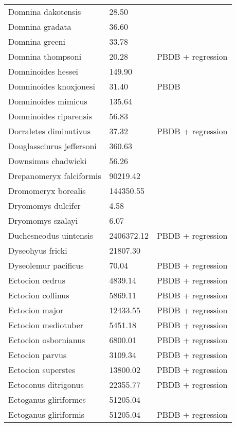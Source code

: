 \documentclass{article}
\begin{document}
\begin{center}
\begin{longtable}{p{} p{} p{} }
  Domnina dakotensis & 28.50 & \cite{Tomiya2013} \\ 
  Domnina gradata & 36.60 & \cite{Tomiya2013} \\ 
  Domnina greeni & 33.78 & \cite{Tomiya2013} \\ 
  Domnina thompsoni & 20.28 & PBDB + regression \\ 
  Domninoides hessei & 149.90 & \cite{Tomiya2013} \\ 
  Domninoides knoxjonesi & 31.40 & PBDB \\ 
  Domninoides mimicus & 135.64 & \cite{Tomiya2013} \\ 
  Domninoides riparensis & 56.83 & \cite{Tomiya2013} \\ 
  Dorraletes diminutivus & 37.32 & PBDB + regression \\ 
  Douglassciurus jeffersoni & 360.63 & \cite{Mihlbachler2006} \\ 
  Downsimus chadwicki & 56.26 & \cite{Tomiya2013} \\ 
  Drepanomeryx falciformis & 90219.42 & \cite{Tomiya2013} \\ 
  Dromomeryx borealis & 144350.55 & \cite{Tomiya2013} \\ 
  Dryomomys dulcifer & 4.58 & \cite{Novacek1977} \\ 
  Dryomomys szalayi & 6.07 & \cite{Novacek1977} \\ 
  Duchesneodus uintensis & 2406372.12 & PBDB + regression \\ 
  Dyseohyus fricki & 21807.30 & \cite{Tomiya2013} \\ 
  Dyseolemur pacificus & 70.04 & PBDB + regression \\ 
  Ectocion cedrus & 4839.14 & PBDB + regression \\ 
  Ectocion collinus & 5869.11 & PBDB + regression \\ 
  Ectocion major & 12433.55 & PBDB + regression \\ 
  Ectocion mediotuber & 5451.18 & PBDB + regression \\ 
  Ectocion osbornianus & 6800.01 & PBDB + regression \\ 
  Ectocion parvus & 3109.34 & PBDB + regression \\ 
  Ectocion superstes & 13800.02 & PBDB + regression \\ 
  Ectoconus ditrigonus & 22355.77 & PBDB + regression \\ 
  Ectoganus gliriformes & 51205.04 & \cite{Novacek1977} \\ 
  Ectoganus gliriformis & 51205.04 & PBDB + regression \\ 

\end{longtable}
\end{center}
\end{document}
